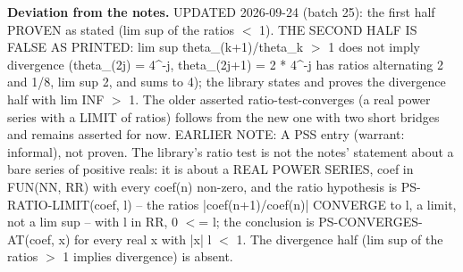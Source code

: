 %
\noindent\textbf{Deviation from the notes.} UPDATED 2026-09-24 (batch 25): the first half PROVEN as stated (lim sup of the ratios $<$ 1). THE SECOND HALF IS FALSE AS PRINTED: lim sup theta\_(k+1)/theta\_k $>$ 1 does not imply divergence (theta\_(2j) = 4\textasciicircum{}-j, theta\_(2j+1) = 2 * 4\textasciicircum{}-j has ratios alternating 2 and 1/8, lim sup 2, and sums to 4); the library states and proves the divergence half with lim INF $>$ 1. The older asserted ratio-test-converges (a real power series with a LIMIT of ratios) follows from the new one with two short bridges and remains asserted for now. EARLIER NOTE: A PSS entry (warrant: informal), not proven. The library's ratio test is not the notes' statement about a bare series of positive reals: it is about a REAL POWER SERIES, coef in FUN(NN, RR) with every coef(n) non-zero, and the ratio hypothesis is PS-RATIO-LIMIT(coef, l) -- the ratios |coef(n+1)/coef(n)| CONVERGE to l, a limit, not a lim sup -- with l in RR, 0 $<$= l; the conclusion is PS-CONVERGES-AT(coef, x) for every real x with |x| l $<$ 1. The divergence half (lim sup of the ratios $>$ 1 implies divergence) is absent.
%
\renewcommand{\thethm}{2.16}
